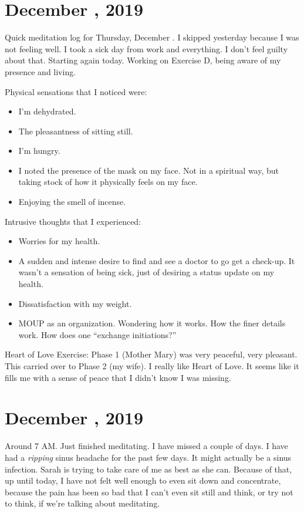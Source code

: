 \documentclass[b6paper]{article}
\begin{document}
\section*{December , 2019}
	
Quick meditation log for Thursday, December . I skipped yesterday because I was not feeling well. I took a sick day from work and everything. I don't feel guilty about that. Starting again today. Working on Exercise D, being aware of my presence and living.

Physical sensations that I noticed were:
\begin{itemize}
	\item I'm dehydrated.
	\item The pleasantness of sitting still.
	\item I'm hungry.
	\item I noted the presence of the mask on my face. Not in a spiritual way, but taking stock of how it physically feels on my face.
	\item Enjoying the smell of incense.
\end{itemize}

Intrusive thoughts that I experienced:
\begin{itemize}
	\item Worries for my health.
	\item A sudden and intense desire to find and see a doctor to go get a check-up. It wasn't a sensation of being sick, just of desiring a status update on my health.
	\item Dissatisfaction with my weight.
	\item MOUP as an organization. Wondering how it works. How the finer details work. How does one ``exchange initiations?''
\end{itemize}

Heart of Love Exercise:
Phase 1 (Mother Mary) was very peaceful, very pleasant. This carried over to Phase 2 (my wife). I really like Heart of Love. It seems like it fills me with a sense of peace that I didn't know I was missing.

\pagebreak

\section*{December , 2019}

Around 7 AM. Just finished meditating. I have missed a couple of days. I have had a \textit{ripping} sinus headache for the past few days. It might actually be a sinus infection. Sarah is trying to take care of me as best as she can. Because of that, up until today, I have not felt well enough to even sit down and concentrate, because the pain has been so bad that I can't even sit still and think, or try not to think, if we're talking about meditating.
\end{document}

